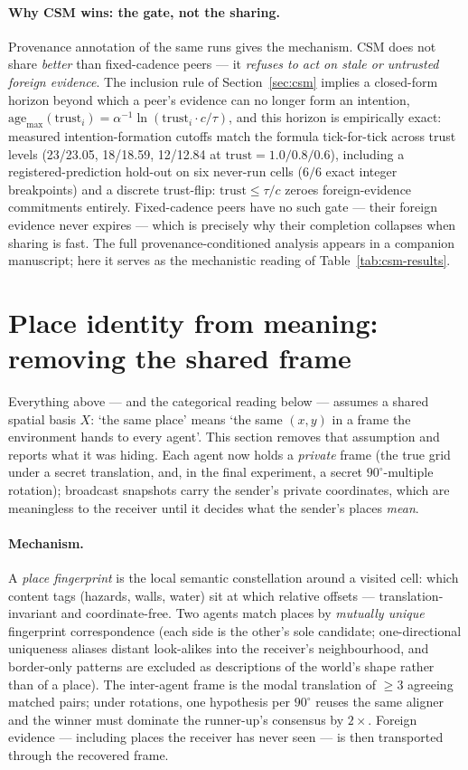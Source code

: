 \documentclass{article}
\begin{document}
\paragraph{Why CSM wins: the gate, not the sharing.} Provenance
annotation of the same runs gives the mechanism. CSM does not share
\emph{better} than fixed-cadence peers --- it \emph{refuses to act on
stale or untrusted foreign evidence}. The inclusion rule of
Section~\ref{sec:csm} implies a closed-form horizon beyond which a
peer's evidence can no longer form an intention,
$\mathrm{age}_{\max}(\mathrm{trust}_i) = \alpha^{-1}
\ln(\mathrm{trust}_i \cdot c/\tau)$, and this horizon is empirically
exact: measured intention-formation cutoffs match the formula
tick-for-tick across trust levels (23/23.05, 18/18.59, 12/12.84 at
$\mathrm{trust}=1.0/0.8/0.6$), including a registered-prediction
hold-out on six never-run cells ($6/6$ exact integer breakpoints) and
a discrete trust-flip: $\mathrm{trust}\le\tau/c$ zeroes
foreign-evidence commitments entirely. Fixed-cadence peers have no
such gate --- their foreign evidence never expires --- which is
precisely why their completion collapses when sharing is fast. The
full provenance-conditioned analysis appears in a companion
manuscript; here it serves as the mechanistic reading of
Table~\ref{tab:csm-results}.

\section{Place identity from meaning: removing the shared frame}
\label{sec:semantic-identity}

Everything above --- and the categorical reading below --- assumes a
shared spatial basis $X$: `the same place' means `the same $(x,y)$ in
a frame the environment hands to every agent'. This section removes
that assumption and reports what it was hiding. Each agent now holds a
\emph{private} frame (the true grid under a secret translation, and,
in the final experiment, a secret $90^\circ$-multiple rotation);
broadcast snapshots carry the sender's private coordinates, which are
meaningless to the receiver until it decides what the sender's places
\emph{mean}.

\paragraph{Mechanism.} A \emph{place fingerprint} is the local
semantic constellation around a visited cell: which content tags
(hazards, walls, water) sit at which relative offsets ---
translation-invariant and coordinate-free. Two agents match places by
\emph{mutually unique} fingerprint correspondence (each side is the
other's sole candidate; one-directional uniqueness aliases distant
look-alikes into the receiver's neighbourhood, and border-only
patterns are excluded as descriptions of the world's shape rather
than of a place). The inter-agent frame is the modal translation of
$\ge 3$ agreeing matched pairs; under rotations, one hypothesis per
$90^\circ$ reuses the same aligner and the winner must dominate the
runner-up's consensus by $2\times$. Foreign evidence --- including
places the receiver has never seen --- is then transported through
the recovered frame.
\end{document}
